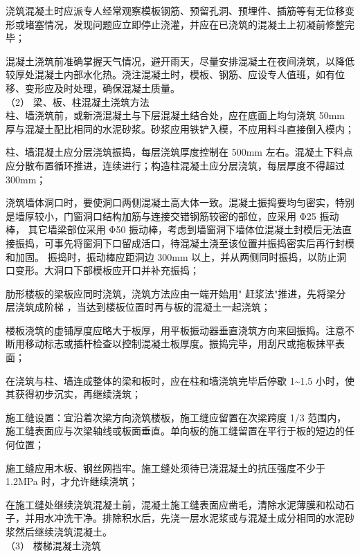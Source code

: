  浇筑混凝土时应派专人经常观察模板钢筋、预留孔洞、预埋件、插筋等有无位移变形或堵塞情况，发现问题应立即停止浇灌，并应在已浇筑的混凝土上初凝前修整完毕；

 混凝土浇筑前准确掌握天气情况，避开雨天，尽量安排混凝土在夜间浇筑，以降低较厚处混凝土内部水化热。浇注混凝土时，模板、钢筋、应设专人值班，如有位移、变形应及时处理，确保混凝土质量。\\

（2） 梁、板、柱混凝土浇筑方法\\

 柱、墙浇筑前，或新浇混凝土与下层混凝土结合处，应在底面上均匀浇筑 50mm 厚与混凝土配比相同的水泥砂浆。砂浆应用铁铲入模，不应用料斗直接倒入模内；

 柱、墙混凝土应分层浇筑振捣，每层浇筑厚度控制在 500mm 左右。混凝土下料点应分散布置循环推进，连续进行；构造柱混凝土应分层浇筑，每层厚度不得超过 300mm；

 浇筑墙体洞口时，要使洞口两侧混凝土高大体一致。混凝土振捣要均匀密实，特别是墙厚较小，门窗洞口结构加筋与连接交错钢筋较密的部位，应采用 Φ25 振动棒，
其它墙梁部位采用 Φ50 振动棒，考虑到墙窗洞下墙体位混凝土封模后无法直接振捣，可事先将窗洞下口留成活口，待混凝土浇至该位置并振捣密实后再行封模和加固。
振捣时，振动棒应距洞边 300mm 以上，并从两侧同时振捣，以防止洞口变形。大洞口下部模板应开口并补充振捣；

 肋形楼板的梁板应同时浇筑，浇筑方法应由一端开始用" 赶浆法"推进，先将梁分层浇筑成阶梯 ，当达到楼板位置时再与板的混凝土一起浇筑；

 楼板浇筑的虚铺厚度应略大于板厚，用平板振动器垂直浇筑方向来回振捣。注意不断用移动标志或插杆检查以控制混凝土板厚度。振捣完毕，用刮尺或拖板抹平表面；

 在浇筑与柱、墙连成整体的梁和板时，应在柱和墙浇筑完毕后停歇 1\textasciitilde1.5 小时，使其获得初步沉实，再继续浇筑；

 施工缝设置：宜沿着次梁方向浇筑楼板，施工缝应留置在次梁跨度 1/3 范围内，施工缝表面应与次梁轴线或板面垂直。单向板的施工缝留置在平行于板的短边的任何位置；

 施工缝应用木板、钢丝网挡牢。施工缝处须待已浇混凝土的抗压强度不少于 1.2MPa 时，才允许继续浇筑；

 在施工缝处继续浇筑混凝土前，混凝土施工缝表面应凿毛，清除水泥薄膜和松动石子，并用水冲洗干净。排除积水后，先浇一层水泥浆或与混凝土成分相同的水泥砂浆然后继续浇筑混凝土。\\

（3） 楼梯混凝土浇筑\\

